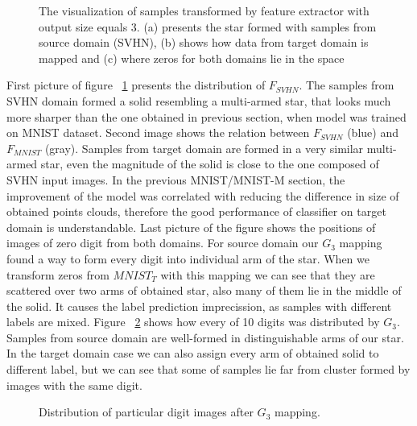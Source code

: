 \documentclass{article}
\begin{document}
\begin{figure}%
    \centering
    \qquad
    \qquad
    \caption{The visualization of samples transformed by feature extractor with output size equals 3. (a) presents the star formed with samples from source domain (SVHN), (b) shows how data from target domain is mapped and (c) where zeros for both domains lie in the space}%
    \label{fig:SVHN_3D}%
\end{figure}
\par
First picture of figure ~\ref{fig:SVHN_3D} presents the distribution of $F_{SVHN}$. The samples from SVHN domain formed a solid resembling a multi-armed star, that looks much more sharper than the one obtained in previous section, when model was trained on MNIST dataset. Second image shows the relation between $F_{SVHN}$ (blue) and $F_{MNIST}$ (gray). Samples from target domain are formed in a very similar multi-armed star, even the magnitude of the solid is close to the one composed of SVHN input images. In the previous MNIST/MNIST-M section, the improvement of the model was correlated with reducing the difference in size of obtained points clouds, therefore the good performance of classifier on target domain is understandable. Last picture of the figure shows the positions of images of zero digit from both domains. For source domain our $G_{3}$ mapping found a way to form every digit into individual arm of the star. When we transform zeros from $MNIST_{T}$ with this mapping we can see that they are scattered over two arms of obtained star, also many of them lie in the middle of the solid. It causes the label prediction imprecission, as samples with different labels are mixed. Figure ~\ref{fig:SVHN_Digits} shows how every of 10 digits was distributed by $G_{3}$. Samples from source domain are well-formed in distinguishable arms of our star. In the target domain case we can also assign every arm of obtained solid to different label, but we can see that some of samples lie far from cluster formed by images with the same digit.

\begin{figure}[htb]%
    \centering
    \qquad
    \caption{Distribution of particular digit images after $G_{3}$ mapping.}%
    \label{fig:SVHN_Digits}%
\end{figure}
\end{document}
